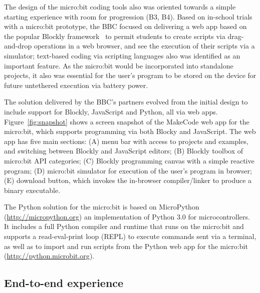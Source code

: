 The design of the micro:bit coding tools also was oriented towards a
simple starting experience with room for progression (B3, B4). Based on in-school trials with a micro:bit prototype, the BBC focused on delivering a web app
based on the popular Blockly framework~\cite{Blocky2015} to permit students to
create scripts via drag-and-drop operations in a web browser, and see
the execution of their scripts via a simulator; text-based coding via scripting languages also
was identified as an important feature. As the micro:bit would be incorporated
into standalone projects, it also was essential for the user's program to be stored on the device for future untethered execution via battery power.



The solution delivered by the BBC's partners evolved from the initial
design to include support for Blockly, JavaScript and Python, all
via web apps.
Figure~\ref{fig:snapshot} shows a screen snapshot of the MakeCode web app
for the micro:bit,
which supports programming via both Blocky and JavaScript.
The web app has five main sections: (A) menu bar with access to projects
and examples, and switching between Blockly and JavaScript editors; (B)
Blockly toolbox of micro:bit API categories; (C) Blockly programming
canvas with a simple reactive program; (D) micro:bit simulator for execution
of the user's program in browser; (E) download button, which invokes the in-browser
compiler/linker to produce a binary executable.

The Python solution for the micro:bit is based on MicroPython (\url{http://micropython.org})
an implementation of Python 3.0 for microcontrollers. It includes
a full Python compiler and runtime that runs on the micro:bit and
supports a read-eval-print loop (REPL) to execute commands sent via
a terminal, as well as to import and run scripts from the Python web app for
the micro:bit (\url{http://python.microbit.org}).

\subsection{End-to-end experience}

